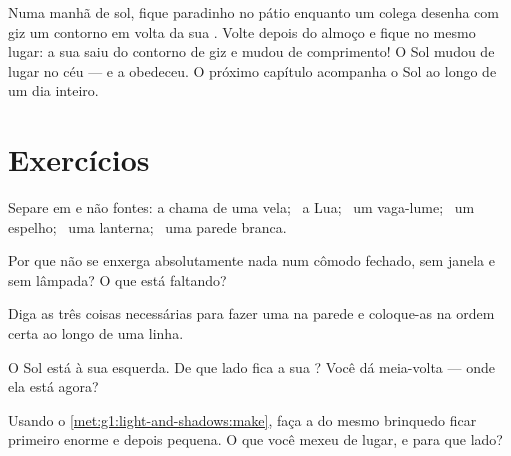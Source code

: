 \begin{example}\label{ex:g1:light-and-shadows:chalk}
Numa manhã de sol, fique paradinho no pátio enquanto um colega
desenha com giz um contorno em volta da sua . Volte depois do
almoço e fique no mesmo lugar: a sua  saiu do contorno de giz e
mudou de comprimento! O Sol mudou de lugar no céu --- e a 
obedeceu. O próximo capítulo acompanha o Sol ao longo de um dia
inteiro.
\end{example}

\section{Exercícios}

\begin{exercise}[$\star$]\label{exo:g1:light-and-shadows:1}
Separe em  e não fontes: a chama de uma vela; \ a Lua;
\ um vaga-lume; \ um espelho; \ uma lanterna; \ uma parede branca.
\end{exercise}

\begin{exercise}[$\star$]\label{exo:g1:light-and-shadows:2}
Por que não se enxerga absolutamente nada num cômodo fechado, sem
janela e sem lâmpada? O que está faltando?
\end{exercise}

\begin{exercise}[$\star$]\label{exo:g1:light-and-shadows:3}
Diga as três coisas necessárias para fazer uma  na parede e
coloque-as na ordem certa ao longo de uma linha.
\end{exercise}

\begin{exercise}[$\star$]\label{exo:g1:light-and-shadows:4}
O Sol está à sua esquerda. De que lado fica a sua ? Você dá
meia-volta --- onde ela está agora?
\end{exercise}

\begin{exercise}[$\star$]\label{exo:g1:light-and-shadows:5}
Usando o \cref{met:g1:light-and-shadows:make}, faça a  do mesmo
brinquedo ficar primeiro enorme e depois pequena. O que você mexeu de
lugar, e para que lado?
\end{exercise}

